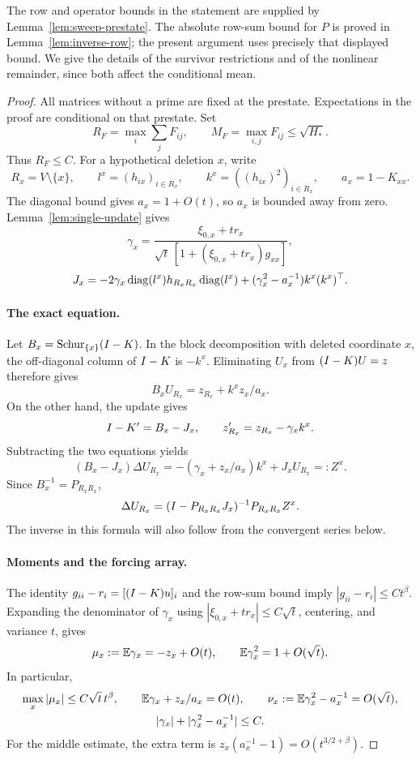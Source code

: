 The row and operator bounds in the statement are supplied by
Lemma~\ref{lem:sweep-prestate}.  The absolute row-sum bound for \(P\) is
proved in Lemma~\ref{lem:inverse-row}; the present argument uses precisely
that displayed bound.  We give the details of the survivor restrictions
and of the nonlinear remainder, since both affect the conditional mean.

\begin{proof}
All matrices without a prime are fixed at the prestate.  Expectations in
the proof are conditional on that prestate.  Set
\[
 R_F=\max_i\sum_jF_{ij},\qquad
 M_F=\max_{i,j}F_{ij}\le\sqrt{H_*}.
\]
Thus \(R_F\le C\).  For a hypothetical deletion \(x\), write
\[
 R_x=V\setminus\{x\},\qquad
 l^x=(h_{ix})_{i\in R_x},\qquad
 k^x=((h_{ix})^2)_{i\in R_x},\qquad a_x=1-K_{xx}.
\]
The diagonal bound gives \(a_x=1+O(t)\), so \(a_x\) is bounded away
from zero.  Lemma~\ref{lem:single-update} gives
\[
 \gamma_x=\frac{\xi_{0,x}+tr_x}
 {\sqrt t\,[1+(\xi_{0,x}+tr_x)g_{xx}]},
\]
\[
 J_x=-2\gamma_x\operatorname{diag}(l^x)h_{R_xR_x}\operatorname{diag}(l^x)
       +(\gamma_x^2-a_x^{-1})k^x(k^x)^\top.
\]

\paragraph{The exact equation.}
Let \(B_x=\operatorname{Schur}_{\{x\}}(I-K)\).  In the block decomposition with
deleted coordinate \(x\), the off-diagonal column of \(I-K\) is
\(-k^x\).  Eliminating \(U_x\) from \((I-K)U=z\) therefore gives
\[
 B_xU_{R_x}=z_{R_x}+k^xz_x/a_x.
\]
On the other hand, the update gives
\[
 I-K'=B_x-J_x,\qquad
 z'_{R_x}=z_{R_x}-\gamma_xk^x.
\]
Subtracting the two equations yields
\[
 (B_x-J_x)\Delta U_{R_x}
 =-(\gamma_x+z_x/a_x)k^x+J_xU_{R_x}=:Z^x.
\]
Since \(B_x^{-1}=P_{R_xR_x}\),
\begin{equation}\label{eq:sweep-lag-exact}
 \Delta U_{R_x}
 =(I-P_{R_xR_x}J_x)^{-1}P_{R_xR_x}Z^x.
\end{equation}
The inverse in this formula will also follow from the convergent series
below.

\paragraph{Moments and the forcing array.}
The identity \(g_{ii}-r_i=[(I-K)u]_i\) and the row-sum bound imply
\(|g_{ii}-r_i|\le Ct^\beta\).  Expanding the denominator of \(\gamma_x\)
using \(|\xi_{0,x}+tr_x|\le C\sqrt t\), centering, and variance \(t\), gives
\[
 \mu_x:=\mathbb E\gamma_x=-z_x+O(t),\qquad
 \mathbb E\gamma_x^2=1+O(\sqrt t).
\]
In particular,
\begin{equation}\label{eq:sweep-lag-moments}
\begin{gathered}
 \max_x|\mu_x|\le C\sqrt t\,t^\beta,\qquad
 \mathbb E\gamma_x+z_x/a_x=O(t),\qquad
 \nu_x:=\mathbb E\gamma_x^2-a_x^{-1}=O(\sqrt t),\\
 |\gamma_x|+|\gamma_x^2-a_x^{-1}|\le C.
\end{gathered}
\end{equation}
For the middle estimate, the extra term is
\(z_x(a_x^{-1}-1)=O(t^{3/2+\beta})\).


\end{proof}
